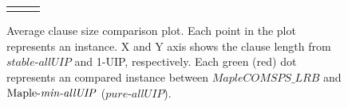 \documentclass[runningheads]{llncs}
\newcommand{\allUip}{\textit{stable-allUIP}}
\newcommand{\allUipPure}{\textit{pure-allUIP}\xspace}
\newcommand{\allUipMin}{\textit{min-allUIP}\xspace}
\newcommand{\MapleBase}{\textit{MapleCOMSPS\_LRB}}
\newcommand{\MapleIUIPPure}{\text{Maple-\allUipPure}}
\newcommand{\MapleIUIMin}{\text{Maple-\allUipMin}}
\newcommand{\nf}[1]{{\color{red}{#1}}}
\begin{document}
\begin{figure}[t!]
{\begin{tabular}[t]{l c l}
\begin{minipage}[t]{0.5\textwidth}
    \caption{Average clause size comparison plot. Each point in the
      plot represents an instance. X and Y axis shows the clause
      length from $\allUip$ and 1-UIP, respectively. Each green (red)
      dot represents an compared instance between $\MapleBase$ and
      $\MapleIUIMin$ ($\allUipPure$).}
      \label{fig:len_compare}
  \end{minipage}

\end{tabular}
}
\end{figure}



\end{document}
